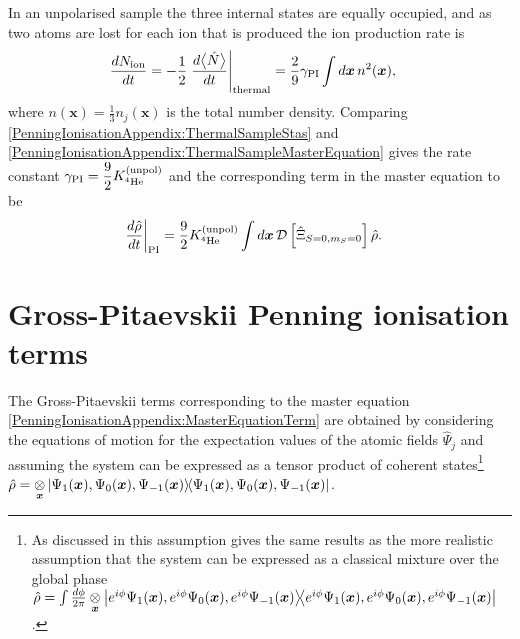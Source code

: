 In an unpolarised sample the three internal states are equally occupied, and as two atoms are lost for each ion that is produced the ion production rate is
\begin{align}
    \frac{d N_\text{ion}}{dt} &= -\frac{1}{2} \left.\frac{d \mean{\hat{N}}}{dt}\right|_\text{thermal} = \frac{2}{9} \gamma_\text{PI} \int d \bm{x}\, n^2(\bm{x}),
    \label{PenningIonisationAppendix:ThermalSampleMasterEquation}
\end{align}
where $n(\bm{x}) = \frac{1}{3}n_j(\bm{x})$ is the total number density.
Comparing \eqref{PenningIonisationAppendix:ThermalSampleStas} and \eqref{PenningIonisationAppendix:ThermalSampleMasterEquation}  gives the rate constant $\displaystyle\gamma_\text{PI} = \frac{9}{2} K^\text{(unpol)}_{^4\text{He}}$ and the corresponding term in the master equation to be
\begin{align}
    \label{PenningIonisationAppendix:MasterEquationTerm}
    \left.\frac{d \hat{\rho}}{dt}\right|_\text{PI} &= \frac{9}{2} \Kunpol \int d \bm{x}\, \mathcal{D}\left[ \hat{\Xi}_{S=0, m_S=0}\right] \hat{\rho}.
\end{align}

\section{Gross-Pitaevskii Penning ionisation terms}
\label{PenningIonisationAppendix:GP}

The Gross-Pitaevskii terms corresponding to the master equation \eqref{PenningIonisationAppendix:MasterEquationTerm} are obtained by considering the equations of motion for the expectation values of the atomic fields $\hat{\Psi}_j$ and assuming the system can be expressed as a tensor product of coherent states\footnote{As discussed in  this assumption gives the same results as the more realistic assumption that the system can be expressed as a classical mixture over the global phase $\hat{\rho} = \int \frac{d\phi}{2\pi}\underset{\bm{x}}{\otimes} \left|e^{i\phi}\Psi_1(\bm{x}), e^{i\phi}\Psi_0(\bm{x}), e^{i\phi}\Psi_{-1}(\bm{x})\middle>\!\middle<e^{i\phi}\Psi_1(\bm{x}), e^{i\phi}\Psi_0(\bm{x}), e^{i\phi}\Psi_{-1}(\bm{x})\right|$.} $\displaystyle\hat{\rho} = \underset{\bm{x}}{\otimes} \left|\Psi_1(\bm{x}), \Psi_0(\bm{x}), \Psi_{-1}(\bm{x})\middle>\!\middle<\Psi_1(\bm{x}), \Psi_0(\bm{x}), \Psi_{-1}(\bm{x})\right|$.

